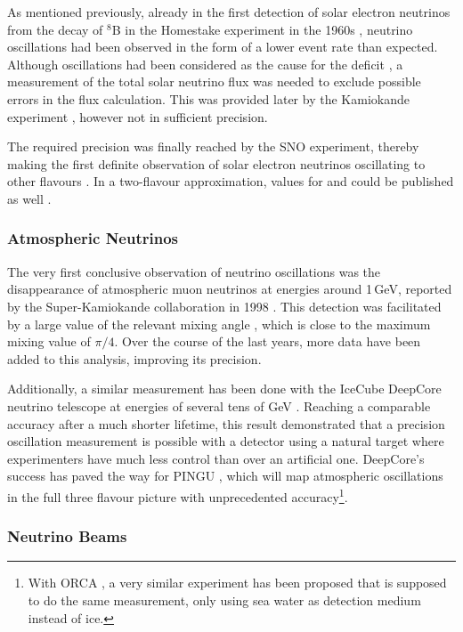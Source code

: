 As mentioned previously, already in the first detection of solar electron
neutrinos from the decay of $^8$B in the Homestake experiment in the 1960s
\cite{DaviesNuOsc}, neutrino oscillations had been observed in the form of a
lower event rate than expected. Although oscillations had been considered as the
cause for the deficit \cite{HomestakeLongterm}, a measurement of the total solar
neutrino flux was needed to exclude possible errors in the flux calculation.
This was provided later by the Kamiokande experiment \cite{SuperKsolar}, however
not in sufficient precision.

The required precision was finally reached by the SNO experiment, thereby making
the first definite observation of solar electron neutrinos oscillating to other
flavours \cite{SNOsolar, SNOosc}. In a two-flavour approximation, values for
 and  could be published as well \cite{SNOparams}.

\subsubsection{Atmospheric Neutrinos}

The very first conclusive observation of neutrino oscillations was the
disappearance of atmospheric muon neutrinos at energies around 1\,GeV, reported
by the Super-Kamiokande collaboration in 1998 \cite{SuperKosc}. This detection
was facilitated by a large value of the relevant mixing angle , which
is close to the maximum mixing value of $\pi/4$. Over the course of the last
years, more data have been added to this analysis, improving its precision.

Additionally, a similar measurement has been done with the IceCube DeepCore
neutrino telescope at energies of several tens of GeV \cite{DCosc}. Reaching a
comparable accuracy after a much shorter lifetime, this result demonstrated that
a precision oscillation measurement is possible with a detector using a natural
target where experimenters have much less control than over an artificial one.
DeepCore's success has paved the way for PINGU \cite{LoI}, which will map
atmospheric oscillations in the full three flavour picture with unprecedented
accuracy\footnote{With ORCA \cite{ORCA}, a very similar experiment has been
proposed that is supposed to do the same measurement, only using sea water
as detection medium instead of ice.}.

\subsubsection{Neutrino Beams}

